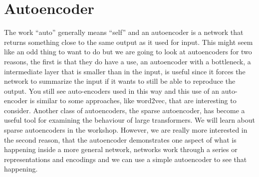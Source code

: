 \documentclass[12pt]{article}
\begin{document}
\section*{Autoencoder} 

The work ``auto'' generally means ``self'' and an autoencoder is a
network that returns something close to the same output as it used for
input. This might seem like an odd thing to want to do but we are
going to look at autoencoders for two reasons, the first is that they
do have a use, an autoencoder with a bottleneck, a intermediate layer
that is smaller than in the input, is useful since it forces the
network to summarize the input if it wants to still be able to
reproduce the output. You still see auto-encoders used in this way and
this use of an auto-encoder is similar to some approaches, like
word2vec, that are interesting to consider. Another class of
autoencoders, the sparse autoencoder, has become a useful tool for
examining the behaviour of large transformers. We will learn about
sparse autoencoders in the workshop. However, we are really more
interested in the second reason, that the autoencoder demonstrates one
aspect of what is happening inside a more general network, networks
work through a series or representations and encodings and we can use
a simple autoencoder to see that happening.
\end{document}
